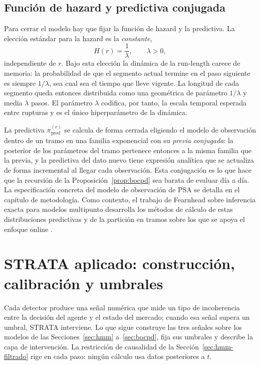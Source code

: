 \subsection{Función de hazard y predictiva conjugada}
\label{sec:bocpd-hazard}

Para cerrar el modelo hay que fijar la función de hazard y la predictiva. La elección estándar para la hazard es la \emph{constante},
\[
H(r) = \frac{1}{\lambda}, \qquad \lambda > 0,
\]
independiente de $r$. Bajo esta elección la dinámica de la run-length carece de memoria: la probabilidad de que el segmento actual termine en el paso siguiente es siempre $1/\lambda$, sea cual sea el tiempo que lleve vigente. La longitud de cada segmento queda entonces distribuida como una geométrica de parámetro $1/\lambda$ y media $\lambda$ pasos. El parámetro $\lambda$ codifica, por tanto, la escala temporal esperada entre rupturas y es el único hiperparámetro de la dinámica.

La predictiva $\pi^{(r)}_{\mathrm{pred}}$ se calcula de forma cerrada eligiendo el modelo de observación dentro de un tramo en una familia exponencial con su \emph{previa conjugada}: la posterior de los parámetros del tramo pertenece entonces a la misma familia que la previa, y la predictiva del dato nuevo tiene expresión analítica que se actualiza de forma incremental al llegar cada observación. Esta conjugación es lo que hace que la recursión de la Proposición~\ref{prop:bocpd} sea barata de evaluar día a día. La especificación concreta del modelo de observación de PSA se detalla en el capítulo de metodología. Como contexto, el trabajo de Fearnhead sobre inferencia exacta para modelos multipunto desarrolla los métodos de cálculo de estas distribuciones predictivas y de la partición en tramos sobre los que se apoya el enfoque online \cite{fearnhead2006}.

\section{STRATA aplicado: construcción, calibración y umbrales}
\label{sec:strata-aplicado}

Cada detector produce una señal numérica que mide un tipo de incoherencia entre la decisión del agente y el estado del mercado; cuando esa señal supera un umbral, STRATA interviene. Lo que sigue construye las tres señales sobre los modelos de las Secciones~\ref{sec:hmm} a~\ref{sec:bocpd}, fija sus umbrales y describe la capa de intervención. La restricción de causalidad de la Sección~\ref{sec:hmm-filtrado} rige en cada paso: ningún cálculo usa datos posteriores a $t$.

